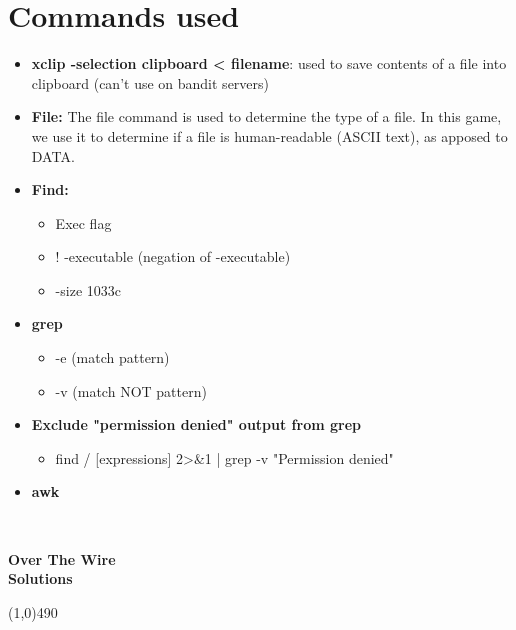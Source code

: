 \documentclass{report}
\begin{document}
    \pagebreak 
    \section*{Commands used}
    \begin{itemize}
        \item \textbf{xclip -selection clipboard < filename}: used to save contents of a file into clipboard (can't use on bandit servers)
        \item \textbf{File:} The file command is used to determine the type of a file. In this game, we use it to determine if a file is human-readable (ASCII text), as apposed to DATA.  
        \item \textbf{Find:}
            \begin{itemize}
                \item Exec flag
                \item ! -executable (negation of -executable)
                \item -size 1033c
            \end{itemize}
        \item \textbf{grep}
            \begin{itemize}
                \item -e (match pattern)
                \item -v (match NOT pattern)
            \end{itemize}
        \item \textbf{Exclude "permission denied" output from grep}
            \begin{itemize}
                \item find / [expressions] 2>\&1 | grep -v "Permission denied"
            \end{itemize}
        \item \textbf{awk}
    \end{itemize}



    \pagebreak  \bigbreak \noindent 
    \vspace{2in} \\
    \begin{Huge}
        \textbf{Over The Wire \\ \hspace*{.4in} Solutions}
    \end{Huge}
    \bigbreak \noindent 
    \line(1,0){490}
\end{document}

